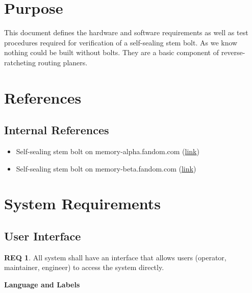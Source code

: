 \documentclass[a4paper,12pt]{article}
\theoremstyle{definition}
\newtheorem{theorem}{REQ}
\begin{document}
\section{Purpose}
This document defines the hardware and software requirements as well as test procedures required for verification of a self-sealing stem bolt. As we know nothing could be built without bolts. They are a basic component of reverse-ratcheting routing planers.
\section{References}

\subsection{Internal References}

\begin{itemize}
	\item  Self-sealing stem bolt on memory-alpha.fandom.com (\href{https://memory-alpha.fandom.com/wiki/Self-sealing_stem_bolt}{link})
	\item  Self-sealing stem bolt on memory-beta.fandom.com (\href{https://memory-beta.fandom.com/wiki/Self-sealing_stembolt}{link})
\end{itemize}

\section{System Requirements}



\subsection{User Interface}

\begin{theorem}
	All system shall have an interface that allows users (operator, maintainer, engineer) to access the system directly.
\end{theorem}

\noindent\textbf{\large{Language and Labels}}
\end{document}
